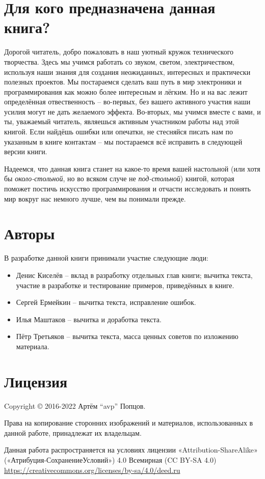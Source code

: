 \documentclass[../sparc.tex]{subfiles}
\begin{document}
\section*{Для кого предназначена данная книга?}

Дорогой читатель, добро пожаловать в наш уютный кружок технического творчества.
Здесь мы учимся работать со звуком, светом, электричеством, используя наши
знания для создания неожиданных, интересных и практически полезных проектов.  Мы
постараемся сделать ваш путь в мир электроники и программирования как можно
более интересным и лёгким.  Но и на вас лежит определённая отвественность --
во-первых, без вашего активного участия наши усилия могут не дать желаемого
эффекта.  Во-вторых, мы учимся вместе с вами, и ты, уважаемый читатель,
являешься активным участником работы над этой книгой.  Если найдёшь ошибки или
опечатки, не стесняйся писать нам по указанным в книге контактам -- мы
постараемся всё исправить в следующей версии книги.

Надеемся, что данная книга станет на какое-то время вашей настольной (или хотя
бы \emph{около-стольной}, но во всяком случе не \emph{под-стольной}) книгой,
которая поможет постичь искусство программирования и отчасти исследовать и
понять мир вокруг нас немного лучше, чем вы понимали прежде.

\section*{Авторы}

В разработке данной книги принимали участие следующие люди:
\begin{itemize}
\item Денис Киселёв -- вклад в разработку отдельных глав книги; вычитка текста,
  участие в разработке и тестирование примеров, приведённых в книге.
\item Сергей Ермейкин -- вычитка текста, исправление ошибок.
\item Илья Маштаков – вычитка и доработка текста.
\item Пётр Третьяков -- вычитка текста, масса ценных советов по изложению
  материала.
\end{itemize}

\section*{Лицензия}

Copyright © 2016-2022 Артём ``avp'' Попцов.

Права на копирование сторонних изображений и материалов, использованных в данной
работе, принадлежат их владельцам.

Данная работа распространяется на условиях лицензии «Attribution-ShareAlike»
(«Атрибуция-СохранениеУсловий») 4.0 Всемирная (CC BY-SA 4.0)
\url{https://creativecommons.org/licenses/by-sa/4.0/deed.ru}
\end{document}
